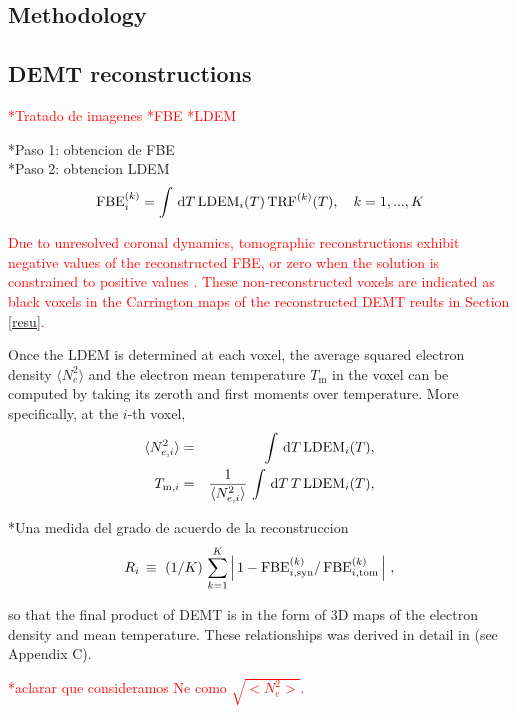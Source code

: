 \documentclass[namedreferences]{solarphysics}
\newcommand{\LDEM}{{\rm LDEM}}
\newcommand{\FBE}{{\rm FBE}}
\newcommand{\TRF}{{\rm TRF}}
\begin{document}
\begin{article}
\section{Methodology}\label{meto}   

\subsection{DEMT reconstructions}\label{demt} 
\textcolor{red}{*Tratado de imagenes}
\textcolor{red}{*FBE}
\textcolor{red}{*LDEM}


*Paso 1: obtencion de FBE\\
*Paso 2: obtencion LDEM
\begin{equation}\label{fbeldem}
\FBE_i^{(k)}  = \int\,\textrm{d}T\,\LDEM_i(T)\,{\TRF}^{(k)}(T), \ \ \ {k=1,...,K}
\end{equation}

\textcolor{red}{
Due to unresolved coronal dynamics, tomographic reconstructions exhibit negative values of the reconstructed FBE, or zero when the solution is constrained to positive values \citep{frazin_2000,frazin_2009}. These non-reconstructed voxels are indicated as black voxels in the Carrington maps of the reconstructed DEMT reults in Section \ref{resu}.
}

Once the LDEM is determined at each voxel, the average squared electron density $\langle N_e^2 \rangle$ and the electron mean temperature $T_\textrm{m}$ in the voxel can be computed by taking its zeroth and first moments over temperature. More specifically, at the $i$-th voxel,
\begin{eqnarray}\label{momento1}
 \langle N_{e,i}^2 \rangle &=& \int\,\textrm{d}T\,\LDEM_i(T),\label{Ne} \\ 
\label{momento2}
 T_{\textrm{m},i}   &=& \frac{1}{\langle N_{e,i}^2 \rangle}\,\int\,\textrm{d}T\,T\,\LDEM_i(T),\label{Tm} 
\end{eqnarray}

*Una medida del grado de acuerdo de la reconstruccion
\begin{equation}\label{R}
R_i \, \equiv \ (1/K) \, \sum_{k=1}^K \left| \, 1 - \FBE^{(k)}_{i,\rm syn} / \,\FBE^{(k)}_{i,\rm tom}\, \right| \,,
\end{equation}

so that the final product of DEMT is in the form of 3D maps of the electron density and mean temperature. These relationships was derived in detail in \citealt{frazin_2009} (see Appendix C). 

\textcolor{red}{*aclarar que consideramos Ne como $\sqrt{<N_e ^2>}$.}


\end{article}
\end{document}
